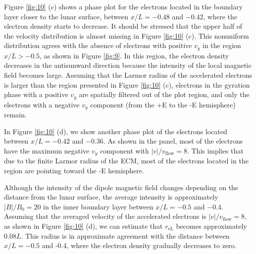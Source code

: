 \documentclass[draft,jgrga]{agutex2015}
\begin{document}
\begin{article}
Figure \ref{fig:10} (c)
shows a phase plot for the electrons located in the boundary layer 
closer to the lunar surface, between $x/L = -0.48$ and $-0.42$, 
where the electron density starts to decrease.
It should be stressed that 
the upper half of the velocity distribution is almost missing in Figure \ref{fig:10} (c).
This nonuniform distribution agrees with the absence of
electrons with positive $v_y$ in
the region $x/L > -0.5$, as shown in Figure \ref{fig:9}.
In this region, 
the electron density decreases in the antisunward direction 
because the intensity of the local magnetic field becomes large.
Assuming that the Larmor radius of the accelerated electrons
is larger than the region presented in Figure \ref{fig:10} (c), 
electrons in the gyration phase with a positive $v_y$ are 
spatially filtered out of the plot region,
and only the electrons with a negative $v_y$ component
(from the +E to the -E hemisphere) remain.

In Figure \ref{fig:10} (d),
we show another phase plot of the electrons located between 
$x/L = -0.42$ and $-0.36$.
As shown in the panel, 
most of the electrons have the maximum negative $v_y$ component 
with $|v|/v_\mathrm{flow}=8$. 
This implies that 
due to the finite Larmor radius of the ECM, 
most of the electrons located in the region are pointing toward
the -E hemisphere. 

Although the intensity of the dipole magnetic field changes depending on 
the distance from the lunar surface, 
the average intensity is approximately $|B|/B_{\mathrm{0}}=20$ 
in the inner boundary layer between $x/L = -0.5$ and $-0.4$.
Assuming that the averaged velocity of the accelerated electrons is 
$|v|/v_\mathrm{flow}=8$, as shown in Figure \ref{fig:10} (d),
we can estimate that $r_\mathrm{eL}$ becomes approximately $0.08L$.
This radius is in approximate agreement with the distance 
between $x/L = -0.5$ and -0.4, where
the electron density gradually decreases to zero.


\end{article}
\end{document}
